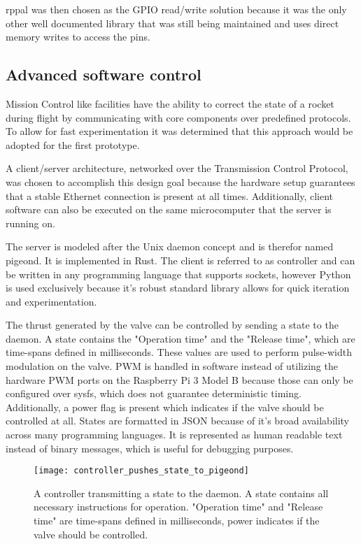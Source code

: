 rppal \cite{rppal} was then chosen as the GPIO read/write solution because it was the only other well documented library that was still being maintained and uses direct memory writes to access the pins.


\subsection{Advanced software control}
Mission Control like facilities have the ability to correct the state of a rocket during flight by communicating with core components over predefined protocols. To allow for fast experimentation it was determined that this approach would be adopted for the first prototype.

A client/server architecture, networked over the Transmission Control Protocol, was chosen to accomplish this design goal because the hardware setup guarantees that a stable Ethernet connection is present at all times. Additionally, client software can also be executed on the same microcomputer that the server is running on.

The server is modeled after the Unix daemon concept and is therefor named pigeond. It is implemented in Rust. The client is referred to as controller and can be written in any programming language that supports sockets, however Python is used exclusively because it's robust standard library allows for quick iteration and experimentation.

The thrust generated by the valve can be controlled by sending a state to the daemon. A state contains the "Operation time" and the "Release time", which are time-spans defined in milliseconds. These values are used to perform pulse-width modulation on the valve. PWM is handled in software instead of utilizing the hardware PWM ports on the Raspberry Pi 3 Model B because those can only be configured over sysfs, which does not guarantee deterministic timing. Additionally, a power flag is present which indicates if the valve should be controlled at all. States are formatted in JSON \cite{json} because of it's broad availability across many programming languages. It is represented as human readable text instead of binary messages, which is useful for debugging purposes. 

\begin{figure}[h]
\centering

\texttt{[image: controller\_pushes\_state\_to\_pigeond]}

\caption{A controller transmitting a state to the daemon. A state contains all necessary instructions for operation. "Operation time" and "Release time" are time-spans defined in milliseconds, power indicates if the valve should be controlled.}
\end{figure}

